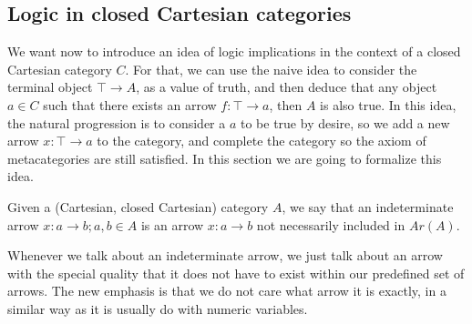 \subsection{Logic in closed Cartesian categories}

We want now to introduce an idea of logic implications in the context of a closed Cartesian category $C$. For that, we can use the naive idea to consider the terminal object $\top \to A$, as a value of truth, and then deduce that any object $a\in C$ such that there exists an arrow $f:\top \to a$, then $A$ is also true. In this idea, the natural progression is to consider a $a$ to be true by desire, so we add a new arrow $x:\top \to a$ to the category, and complete the category so the axiom of metacategories are still satisfied. In this section we are going to formalize this idea.
\begin{definition}
Given a (Cartesian, closed Cartesian) category $A$, we say that an indeterminate arrow $x: a \to b; a,b \in A$ is an arrow $x:a \to b$  not necessarily included in $Ar(A)$. 
\end{definition}
\begin{remark}\label{remark-indeterminates}
  Whenever we talk about an indeterminate arrow, we just talk about an arrow with the special quality that it does not have to exist within our predefined set of arrows. The new emphasis is that we do not care what arrow it is exactly, in a similar way as it is usually do with numeric variables. 
\end{remark}
